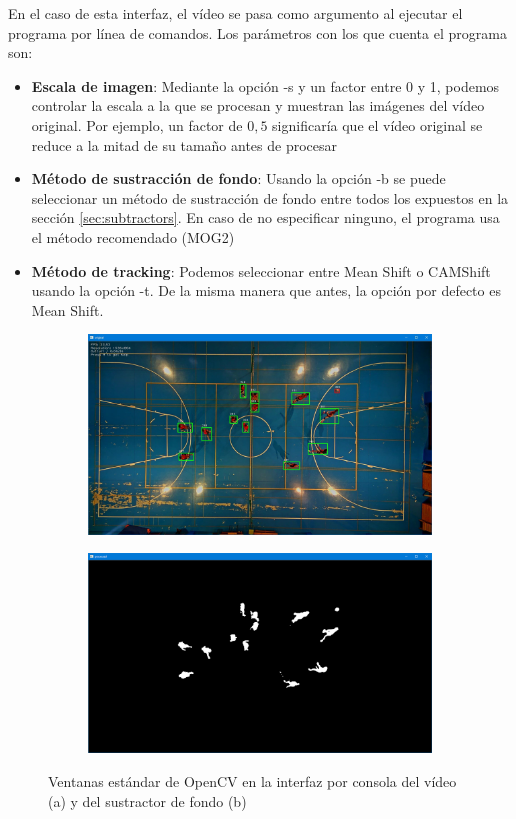 En el caso de esta interfaz, el vídeo se pasa como argumento al ejecutar el programa por línea de comandos. Los parámetros con los que cuenta el programa son:

\begin{itemize}
  \item \textbf{Escala de imagen}: Mediante la opción -s y un factor entre 0 y 1, podemos controlar la escala a la que se procesan y muestran las imágenes del vídeo original. Por ejemplo, un factor de $0,5$ significaría que el vídeo original se reduce a la mitad de su tamaño antes de procesar
  \item \textbf{Método de sustracción de fondo}: Usando la opción -b se puede seleccionar un método de sustracción de fondo entre todos los expuestos en la sección \ref{sec:subtractors}. En caso de no especificar ninguno, el programa usa el método recomendado (MOG2)
  \item \textbf{Método de tracking}: Podemos seleccionar entre Mean Shift o CAMShift usando la opción -t. De la misma manera que antes, la opción por defecto es Mean Shift.
\end{itemize}

\begin{figure}
\begin{subfigure}{.5\textwidth}
  \centering
  \includegraphics[width=.9\linewidth]{images/original}
  \caption { }
  \label{fig:ventanaoriginal}
\end{subfigure}%
\begin{subfigure}{.5\textwidth}
  \centering
  \includegraphics[width=.9\linewidth]{images/processed}
  \caption { }
  \label{fig:ventanaprocessed}
\end{subfigure}
\caption{Ventanas estándar de OpenCV en la interfaz por consola del vídeo (a) y del sustractor de fondo (b) }
\label{fig:ventanas}
\end{figure}


